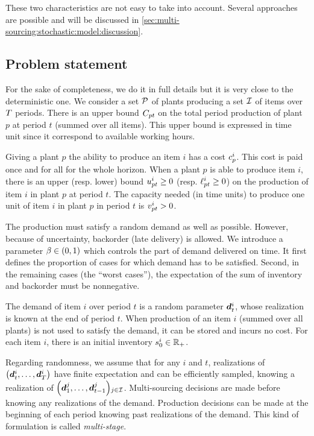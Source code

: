These two characteristics are not easy to take into account.
Several approaches are possible and will be discussed in \cref{sec:multi-sourcing:stochastic:model:discussion}.



\subsection{Problem statement}
\label{sec:multi-sourcing:stochastic:introduction:problem-statement}


For the sake of completeness, we do it in full details but it is very close to the deterministic one.
We consider a set $\mathcal{P}$ of plants producing a set $\mathcal{I}$ of items over $T$ periods.
There is an upper bound $C_{pt}$ on the total period production of plant $p$ at period $t$ (summed over all items).
This upper bound is expressed in time unit since it correspond to available working hours.


Giving a plant $p$ the ability to produce an item $i$ has a cost $c_p^i$.
This cost is paid once and for all for the whole horizon.
When a plant $p$ is able to produce item $i$, there is an upper (resp. lower) bound $u_{pt}^i\ge 0$ (resp. $\ell_{pt}^i\ge 0$) on the production of item $i$ in plant $p$ at period $t$.
The capacity needed (in time units) to produce one unit of item $i$ in plant $p$ in period $t$ is $v_{pt}^i>0$.


The production must satisfy a random demand as well as possible.
However, because of uncertainty, backorder (\ie late delivery) is allowed.
We introduce a parameter $\servicelvl\in\bracket{0,1}$ which controls the part of demand delivered on time.
It first defines the proportion of cases for which demand has to be satisfied.
Second, in the remaining cases (\ie the ``worst cases''), the expectation of the sum of inventory and backorder must be nonnegative.


The demand of item $i$ over period $t$ is a random parameter $\va\demand_t^i$, whose realization is known at the end of period $t$.
When production of an item $i$ (summed over all plants) is not used to satisfy the demand, it can be stored and incurs no cost.
For each item $i$, there is an initial inventory $s_0^i\in\mathbb{R}_+$.


Regarding randomness, we assume that for any $i$ and $t$, realizations of $\bracket{\va\demand_t^i,\ldots,\va\demand_{\horizon}^i}$ have finite expectation and can be efficiently sampled, knowing a realization of $\bracket{\va\demand_1^j,\ldots,\va\demand_{t-1}^j}_{j\in\REF}$.
Multi-sourcing decisions are made before knowing any realizations of the demand.
Production decisions can be made at the beginning of each period knowing past realizations of the demand.
This kind of formulation is called \emph{multi-stage}.


